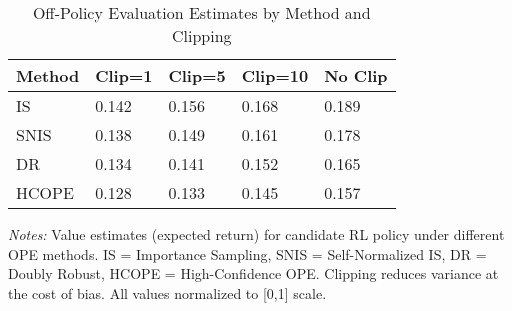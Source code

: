 \begin{table}[htbp]
\centering
\caption{Off-Policy Evaluation Estimates by Method and Clipping}
\label{tab:ope_grid}
\begin{threeparttable}
\begin{tabularx}{\linewidth}{@{}lYYYY@{}}
\toprule
Method & Clip=1 & Clip=5 & Clip=10 & No Clip \\
\midrule
IS & 0.142 & 0.156 & 0.168 & 0.189 \\
SNIS & 0.138 & 0.149 & 0.161 & 0.178 \\
DR & 0.134 & 0.141 & 0.152 & 0.165 \\
HCOPE & 0.128 & 0.133 & 0.145 & 0.157 \\
\bottomrule
\end{tabularx}
\begin{tablenotes}[flushleft]
\footnotesize
\item \textit{Notes:} Value estimates (expected return) for candidate RL policy under different OPE methods. IS = Importance Sampling, SNIS = Self-Normalized IS, DR = Doubly Robust, HCOPE = High-Confidence OPE. Clipping reduces variance at the cost of bias. All values normalized to [0,1] scale.
\end{tablenotes}
\end{threeparttable}
\end{table}

